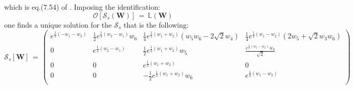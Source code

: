 \documentclass[10pt,a4paper]{article}
\begin{document}
which is eq.(7.54) of \cite{pgtstheory}. Imposing the identification:
\begin{equation}\label{lanerossi}
  \mathcal{O}\left[\mathcal{S}_{s}(\mathbf{W}) \right] \, = \, \mathbb{L}\left(\mathbf{W}\right)
\end{equation}
one finds a unique solution for the $\mathcal{S}_{s}$ that is the following:
\begin{equation}\label{cartoon}
  \mathcal{S}_{s}[\mathbf{W}] \, =\,\left(
\begin{array}{cccc}
 e^{\frac{1}{2} \left(-w_1-w_2\right)} & \frac{1}{2} e^{\frac{1}{2}
   \left(w_2-w_1\right)} w_6 & \frac{1}{4} e^{\frac{1}{2} \left(w_1+w_2\right)}
   \left(w_5 w_6-2 \sqrt{2} w_4\right) & \frac{1}{4} e^{\frac{1}{2}
   \left(w_1-w_2\right)} \left(2 w_5+\sqrt{2} w_3 w_6\right) \\
 0 & e^{\frac{1}{2} \left(w_2-w_1\right)} & \frac{1}{2} e^{\frac{1}{2}
   \left(w_1+w_2\right)} w_5 & \frac{e^{\frac{1}{2} \left(w_1-w_2\right)}
   w_3}{\sqrt{2}} \\
 0 & 0 & e^{\frac{1}{2} \left(w_1+w_2\right)} & 0 \\
 0 & 0 & -\frac{1}{2} e^{\frac{1}{2} \left(w_1+w_2\right)} w_6 & e^{\frac{1}{2}
   \left(w_1-w_2\right)} \\
\end{array}
\right)
\end{equation}
\end{document}
